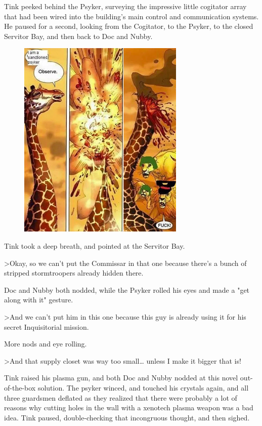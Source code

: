 Tink peeked behind the Psyker, surveying the impressive little cogitator array that had been wired into the building's main control and communication systems. 
He paused for a second, looking from the Cogitator, to the Psyker, to the closed Servitor Bay, and then back to Doc and Nubby.

\begin{figure}
	\begin{center}
		\includegraphics[width=\figwidth]{pics/21/84.png}
	\end{center}
\end{figure}
Tink took a deep breath, and pointed at the Servitor Bay.

>Okay, so we can't put the Commissar in that one because there's a bunch of stripped stormtroopers already hidden there.

Doc and Nubby both nodded, while the Psyker rolled his eyes and made a "get along with it" gesture.

>And we can't put him in this one because this guy is already using it for his secret Inquisitorial mission.

More nods and eye rolling.

>And that supply closet was way too small… unless I make it bigger that is!

Tink raised his plasma gun, and both Doc and Nubby nodded at this novel out-of-the-box solution. 
The psyker winced, and touched his crystals again, and all three guardsmen deflated as they realized that there were probably a lot of reasons why cutting holes in the wall with a xenotech plasma weapon was a bad idea. 
Tink paused, double-checking that incongruous thought, and then sighed.

